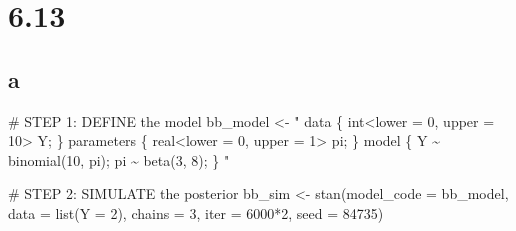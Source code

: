 \documentclass[
  letterpaper,
  DIV=11,
  numbers=noendperiod]{scrartcl}
\newenvironment{Shaded}{\begin{snugshade}}{\end{snugshade}}
\newcommand{\AttributeTok}[1]{\textcolor[rgb]{0.40,0.45,0.13}{#1}}
\newcommand{\CommentTok}[1]{\textcolor[rgb]{0.37,0.37,0.37}{#1}}
\newcommand{\DecValTok}[1]{\textcolor[rgb]{0.68,0.00,0.00}{#1}}
\newcommand{\FunctionTok}[1]{\textcolor[rgb]{0.28,0.35,0.67}{#1}}
\newcommand{\NormalTok}[1]{\textcolor[rgb]{0.00,0.23,0.31}{#1}}
\newcommand{\OtherTok}[1]{\textcolor[rgb]{0.00,0.23,0.31}{#1}}
\newcommand{\SpecialCharTok}[1]{\textcolor[rgb]{0.37,0.37,0.37}{#1}}
\newcommand{\StringTok}[1]{\textcolor[rgb]{0.13,0.47,0.30}{#1}}
\begin{document}
\hypertarget{section-6}{%
\section{6.13}\label{section-6}}

\hypertarget{a-6}{%
\subsection{a}\label{a-6}}

\begin{Shaded}
\begin{Highlighting}[]
\CommentTok{\# STEP 1: DEFINE the model}
\NormalTok{bb\_model }\OtherTok{\textless{}{-}} \StringTok{"}
\StringTok{  data \{}
\StringTok{    int\textless{}lower = 0, upper = 10\textgreater{} Y;}
\StringTok{  \}}
\StringTok{  parameters \{}
\StringTok{    real\textless{}lower = 0, upper = 1\textgreater{} pi;}
\StringTok{  \}}
\StringTok{  model \{}
\StringTok{    Y \textasciitilde{} binomial(10, pi);}
\StringTok{    pi \textasciitilde{} beta(3, 8);}
\StringTok{  \}}
\StringTok{"}

\CommentTok{\# STEP 2: SIMULATE the posterior}
\NormalTok{bb\_sim }\OtherTok{\textless{}{-}} \FunctionTok{stan}\NormalTok{(}\AttributeTok{model\_code =}\NormalTok{ bb\_model, }\AttributeTok{data =} \FunctionTok{list}\NormalTok{(}\AttributeTok{Y =} \DecValTok{2}\NormalTok{), }
               \AttributeTok{chains =} \DecValTok{3}\NormalTok{, }\AttributeTok{iter =} \DecValTok{6000}\SpecialCharTok{*}\DecValTok{2}\NormalTok{, }\AttributeTok{seed =} \DecValTok{84735}\NormalTok{)}
\end{Highlighting}
\end{Shaded}
\end{document}
